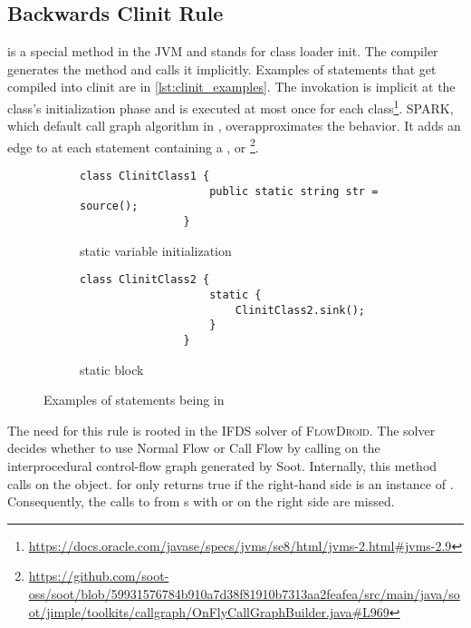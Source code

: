 \documentclass[../draft.tex]{subfiles}
\begin{document}
    \subsection{Backwards Clinit Rule}\label{s:clinitrule}
     is a special method in the JVM and stands for class loader init. The compiler generates the method and calls it implicitly. Examples of statements that get compiled into clinit are in \autoref{lst:clinit_examples}. The invokation is implicit at the class's initialization phase and is executed at most once for each class\footnote{\url{https://docs.oracle.com/javase/specs/jvms/se8/html/jvms-2.html\#jvms-2.9}}. 
    SPARK, which default call graph algorithm in , overapproximates the  behavior. It adds an edge to  at each statement containing a ,  or 
    \footnote{\url{https://github.com/soot-oss/soot/blob/59931576784b910a7d38f81910b7313aa2feafea/src/main/java/soot/jimple/toolkits/callgraph/OnFlyCallGraphBuilder.java\#L969}}.
   
    \begin{figure}[ht]
        \centering
        \begin{subfigure}[b]{0.45\textwidth}
            \centering
            \begin{lstlisting}[gobble=16]
                class ClinitClass1 {
                    public static string str = source();
                }
            \end{lstlisting}
            \caption{static variable initialization}
            \label{lst:clinit_examples_a}
        \end{subfigure}
        \hfill
        \begin{subfigure}[b]{0.45\textwidth}
            \centering
            \begin{lstlisting}[gobble=16]
                class ClinitClass2 {
                    static {
                        ClinitClass2.sink();
                    }
                }
            \end{lstlisting}
            \caption{static block}
            \label{lst:clinit_examples_b}
        \end{subfigure}
        \caption{Examples of statements being in }
        \label{lst:clinit_examples}
    \end{figure}


    The need for this rule is rooted in the IFDS solver of \textsc{FlowDroid}. The solver decides whether to use Normal Flow or Call Flow by calling  on the interprocedural control-flow graph generated by Soot. Internally, this method calls  on the  object.  for  only returns true if the right-hand side is an instance of . Consequently, the calls to  from s with  or  on the right side are missed.
\end{document}
